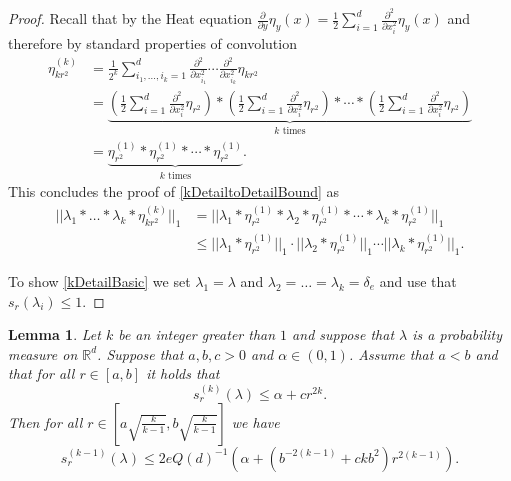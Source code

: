 \documentclass[10pt, english,oneside,reqno]{amsart}
\theoremstyle{plain}
\newtheorem{lemma}[theorem]{Lemma}
\theoremstyle{remark}
\numberwithin{equation}{section}
\numberwithin{figure}{section}
\newcommand{\R}{\mathbb{R}}
\begin{document}
\begin{proof}
    Recall that by the Heat equation $\frac{\partial}{\partial y}\eta_y(x) = \frac{1}{2} \sum_{i = 1}^d\frac{\partial^2}{\partial x_i^2}\eta_y(x)$ and therefore by standard properties of convolution 
    \begin{align*}
       \eta^{(k)}_{kr^2} &= \frac{1}{2^k}\sum_{i_1, \ldots , i_k = 1}^d\frac{\partial^{2}}{\partial x_{i_1}^{2}} \cdots \frac{\partial^{2}}{\partial x_{i_k}^{2}} \eta_{kr^2} \\
       &= \underbrace{\left( \frac{1}{2} \sum_{i = 1}^d\frac{\partial^2}{\partial x_i^2}\eta_{r^2}  \right) * \left( \frac{1}{2} \sum_{i = 1}^d\frac{\partial^2}{\partial x_i^2}\eta_{r^2}  \right) * \cdots * \left( \frac{1}{2} \sum_{i = 1}^d\frac{\partial^2}{\partial x_i^2}\eta_{r^2}  \right)}_{k \text{ times}} \\
       &= \underbrace{\eta_{r^2}^{(1)} * \eta_{r^2}^{(1)} * \cdots * \eta_{r^2}^{(1)}}_{k \text{ times}}.
    \end{align*} This concludes the proof of \eqref{kDetailtoDetailBound} as
    \begin{align*}
        ||\lambda_1 * \ldots * \lambda_k * \eta_{kr^2}^{(k)}||_1 &= ||\lambda_1 * \eta_{r^2}^{(1)} * \lambda_2 * \eta_{r^2}^{(1)} * \cdots * \lambda_k * \eta_{r^2}^{(1)}||_1 \\
        &\leq ||\lambda_1 * \eta_{r^2}^{(1)}||_1 \cdot ||\lambda_2 * \eta_{r^2}^{(1)}|| _1  \cdots ||\lambda_k * \eta_{r^2}^{(1)}||_1.
    \end{align*}

    To show \eqref{kDetailBasic} we set $\lambda_1 = \lambda$ and $\lambda_2 = \ldots = \lambda_k = \delta_e$ and use that $s_r(\lambda_i) \leq 1$.
\end{proof}


\begin{lemma}\label{ktok-1DetailBound}
    Let $k$ be an integer greater than $1$ and suppose that $\lambda$ is a probability measure on $\R^d$. Suppose that $a, b, c > 0$ and $\alpha \in (0,1)$. Assume that $a < b$ and that for all $r\in [a,b]$ it holds that $$s_r^{(k)}(\lambda) \leq \alpha + cr^{2k}.$$ Then for all $r \in \left[ a\sqrt{\frac{k}{k-1}}, b \sqrt{\frac{k}{k-1}}  \right]$ we have $$s_{r}^{(k-1)}(\lambda) \leq 2eQ(d)^{-1} \left(\alpha  + (b^{-2(k-1)} + ckb^2)r^{2(k-1)}\right).$$
\end{lemma}
\end{document}
